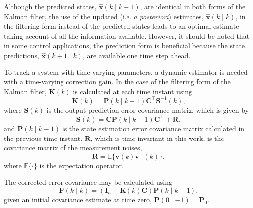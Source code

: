 Although the predicted states, $\hat{\mathbf{x}}(k \mid k-1)$, are identical in both forms of the Kalman filter, the use of the updated (i.e. \textit{a posteriori}) estimates, $\hat{\mathbf{x}}(k \mid k)$, in the filtering form instead of the predicted states leads to an optimal estimate taking account of all the information available. However, it should be noted that in some control applications, the prediction form is beneficial because the state predictions, $\hat{\mathbf{x}}(k+1 \mid k)$, are available one time step ahead.

To track a system with time-varying parameters, a dynamic estimator is needed with a time-varying correction gain. In the case of the filtering form of the Kalman filter, $\mathbf{K}(k)$ is calculated at each time instant using
\begin{equation} \label{eq:Kk}
	\mathbf{K}(k) = \mathbf{P}(k \mid k-1)\mathbf{C}^\intercal \mathbf{S}^{-1}(k),
\end{equation}
where $\mathbf{S}(k)$ is the output prediction error covariance matrix, which is given by
%
\begin{equation} \label{eq:Sk}
	\mathbf{S}(k) = \mathbf{C}\mathbf{P}(k \mid k-1)\mathbf{C}^\intercal + \mathbf{R},
\end{equation}
%
and $\mathbf{P}(k \mid k-1)$ is the state estimation error covariance matrix calculated in the previous time instant. $\mathbf{R}$, which is time invariant in this work, is the covariance matrix of the measurement noises,
%
\begin{equation} \label{eq:R}
	 \mathbf{R} = \mathbb{E}\{ \mathbf{v}(k) \mathbf{v}^\intercal(k) \},
\end{equation}
%
where $\mathbb{E}\{\cdot\}$ is the expectation operator.

The corrected error covariance may be calculated using
%
\begin{equation} \label{eq:Pk}
	\mathbf{P}(k \mid k) = \left( \mathbf{I}_n - \mathbf{K}(k) \mathbf{C} \right) \mathbf{P}(k \mid k-1),
\end{equation}
given an initial covariance estimate at time zero, $\mathbf{P}(0 \mid -1)=\mathbf{P}_0$.%

